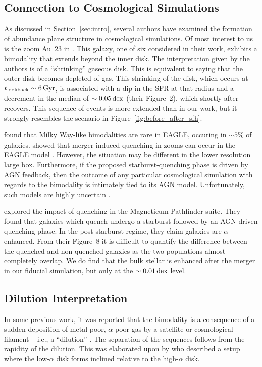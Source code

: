 \subsection{Connection to Cosmological Simulations}\label{ssec:cosmo}
As discussed in Section~\ref{sec:intro}, several authors have examined the formation of abundance plane structure in cosmological simulations. Of most interest to us is the zoom Au~23 in \citet{2018MNRAS.474.3629G}. This galaxy, one of six considered in their work, exhibits a bimodality that extends beyond the inner disk. The interpretation given by the authors is of a ``shrinking'' gaseous disk. This is equivalent to saying that the outer disk becomes depleted of gas. This shrinking of the disk, which occurs at $t_{\textrm{lookback}}\sim6\,\textrm{Gyr}$, is associated with a dip in the SFR at that radius and a decrement in the median \alphaFe{} of $\sim0.05\,\textrm{dex}$ (their Figure~2), which shortly after recovers. This sequence of events is more extended than in our work, but it strongly resembles the scenario in Figure~\ref{fig:before_after_sfh}.

\citet{2018MNRAS.477.5072M} found that Milky Way-like bimodalities are rare in EAGLE, occuring in $\sim5\%$ of galaxies. \citet{2021MNRAS.501..236D,2022MNRAS.515.1430D} showed that merger-induced quenching in zooms can occur in the EAGLE model \citep[see also][]{2017MNRAS.465..547P}. However, the situation may be different in the lower resolution large box. Furthermore, if the proposed starburst-quenching phase is driven by AGN feedback, then the outcome of any particular cosmological simulation with regards to the bimodality is intimately tied to its AGN model. Unfortunately, such models are highly uncertain .

\citet{2023arXiv231016085K} explored the impact of quenching in the Magneticum Pathfinder suite. They found that galaxies which quench undergo a starburst followed by an AGN-driven quenching phase. In the post-starburst regime, they claim galaxies are $\alpha$-enhanced. From their Figure~8 it is difficult to quantify the difference between the quenched and non-quenched galaxies as the two populations almost completely overlap. We do find that the bulk stellar \MgFe{} is enhanced after the merger in our fiducial simulation, but only at the $\sim0.01\,\textrm{dex}$ level.

\subsection{Dilution Interpretation}\label{ssec:dilute}
In some previous work, it was reported that the bimodality is a consequence of a sudden deposition of metal-poor, $\alpha$-poor gas by a satellite or cosmological filament -- i.e., a ``dilution'' \citep{2020MNRAS.491.5435B,2021MNRAS.503.5846R}. The separation of the sequences follows from the rapidity of the dilution. This was elaborated upon by \citet{2021MNRAS.503.5868R} who described a setup where the low-$\alpha$ disk forms inclined relative to the high-$\alpha$ disk.

